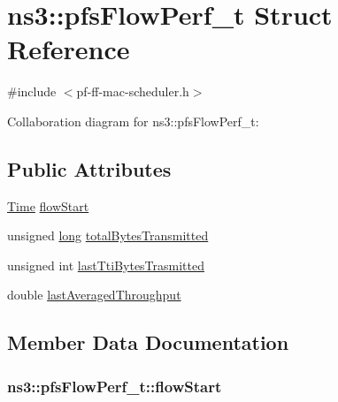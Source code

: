 \hypertarget{structns3_1_1pfsFlowPerf__t}{}\section{ns3\+:\+:pfs\+Flow\+Perf\+\_\+t Struct Reference}
\label{structns3_1_1pfsFlowPerf__t}


{\ttfamily \#include $<$pf-\/ff-\/mac-\/scheduler.\+h$>$}



Collaboration diagram for ns3\+:\+:pfs\+Flow\+Perf\+\_\+t\+:
\subsection*{Public Attributes}
\begin{DoxyCompactItemize}
\item 
\hyperlink{classns3_1_1Time}{Time} \hyperlink{structns3_1_1pfsFlowPerf__t_a571ff44bfa1789e3dba4ba7b5b293c06}{flow\+Start}
\item 
unsigned \hyperlink{generate__test__data__lte__sinr_8m_a0eab6be67e93c3411f7a8b53cc297285}{long} \hyperlink{structns3_1_1pfsFlowPerf__t_a12642f04c523bb4790ea004ecaabd2cf}{total\+Bytes\+Transmitted}
\item 
unsigned int \hyperlink{structns3_1_1pfsFlowPerf__t_ab95ef0042e2fd28be31982046b9485a9}{last\+Tti\+Bytes\+Trasmitted}
\item 
double \hyperlink{structns3_1_1pfsFlowPerf__t_a6c5cfb351e700e78b7046d535c76b8d8}{last\+Averaged\+Throughput}
\end{DoxyCompactItemize}


\subsection{Member Data Documentation}
\subsubsection[{\texorpdfstring{flow\+Start}{flowStart}}]{ ns3\+::pfs\+Flow\+Perf\+\_\+t\+::flow\+Start}\hypertarget{structns3_1_1pfsFlowPerf__t_a571ff44bfa1789e3dba4ba7b5b293c06}{}\label{structns3_1_1pfsFlowPerf__t_a571ff44bfa1789e3dba4ba7b5b293c06}
